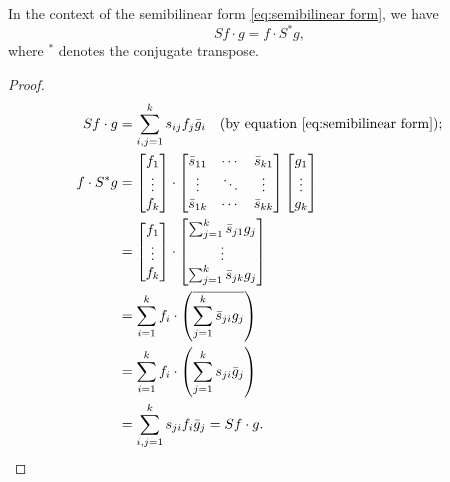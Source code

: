 \documentclass[11pt, oneside, a4paper]{article}
\begin{document}
\begin{prop}\cite[p.287]{CoddingtonLevinson}
    In the context of the semibilinear form \eqref{eq:semibilinear form}, we have
    \begin{equation}\label{eq:semibilinear adjoint}
        Sf\cdot g = f\cdot S^*g, 
    \end{equation}
    where $^*$ denotes the conjugate transpose.
\end{prop}
\begin{proof}
    \begin{align*}
        Sf\cdot g &= \sum_{i,j=1}^k s_{ij}f_j\bar{g}_i \quad\mbox{(by equation \eqref{eq:semibilinear form})};\\
        f\cdot S^*g &= \begin{bmatrix}
            f_1\\
            \vdots\\
            f_k
        \end{bmatrix}\cdot \begin{bmatrix}
            \bar{s}_{11} & \cdots & \bar{s}_{k1}\\
            \vdots & \ddots & \vdots\\
            \bar{s}_{1k} & \cdots & \bar{s}_{kk}
        \end{bmatrix} \begin{bmatrix}
            g_1\\
            \vdots\\
            g_k
        \end{bmatrix}\\
        &= \begin{bmatrix}
            f_1\\
            \vdots\\
            f_k
        \end{bmatrix}\cdot \begin{bmatrix}
            \sum_{j=1}^k \bar{s}_{j1}g_j\\
            \vdots\\
            \sum_{j=1}^k \bar{s}_{jk}g_j
        \end{bmatrix}\\
        &= \sum_{i=1}^k f_i\cdot \left(\overline{\sum_{j=1}^k\bar{s}_{ji}g_j}\right)\\
        &= \sum_{i=1}^k f_i\cdot \left(\sum_{j=1}^k s_{ji}\bar{g}_j\right)\\
        &= \sum_{i,j=1}^k s_{ji}f_i\bar{g}_j = Sf\cdot g.\qedhere
    \end{align*}
\end{proof}
\end{document}
